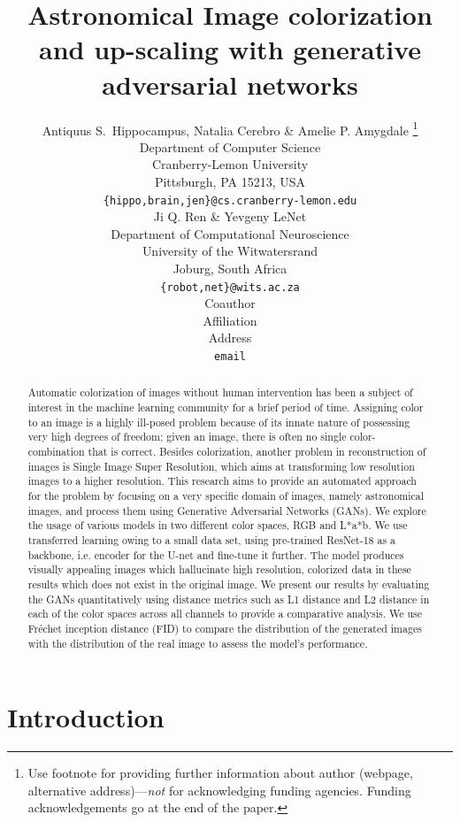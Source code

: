 \documentclass{article} %
\title{Astronomical Image colorization and up-scaling with generative adversarial networks}
\author{Antiquus S.~Hippocampus, Natalia Cerebro \& Amelie P. Amygdale \thanks{ Use footnote for providing further information
about author (webpage, alternative address)---\emph{not} for acknowledging
funding agencies.  Funding acknowledgements go at the end of the paper.} \\
Department of Computer Science\\
Cranberry-Lemon University\\
Pittsburgh, PA 15213, USA \\
\texttt{\{hippo,brain,jen\}@cs.cranberry-lemon.edu} \\
\And
Ji Q. Ren \& Yevgeny LeNet \\
Department of Computational Neuroscience \\
University of the Witwatersrand \\
Joburg, South Africa \\
\texttt{\{robot,net\}@wits.ac.za} \\
\AND
Coauthor \\
Affiliation \\
Address \\
\texttt{email}
}
\begin{document}
\usetikzlibrary{chains, calc,fit}

\maketitle

\begin{abstract}
Automatic colorization of images without human intervention has been a subject of interest in the machine learning community for a brief period of time. Assigning color to an image is a highly ill-posed problem because of its innate nature of possessing very high degrees of freedom; given an image, there is often no single color-combination that is correct. Besides colorization, another problem in reconstruction of images is Single Image Super Resolution, which aims at transforming low resolution images to a higher resolution. This research aims to provide an automated approach for the problem by focusing on a very specific domain of images, namely astronomical images, and process them using Generative Adversarial Networks (GANs). We explore the usage of various models in two different color spaces, RGB and L*a*b. We use transferred learning owing to a small data set, using pre-trained ResNet-18 as a backbone, i.e. encoder for the U-net and fine-tune it further. The model produces visually appealing images which hallucinate high resolution, colorized data in these results which does not exist in the original image. We present our results by evaluating the GANs quantitatively using distance metrics such as L1 distance and L2 distance in each of the color spaces across all channels to provide a comparative analysis. We use Fréchet inception distance (FID) to compare the distribution of the generated images with the distribution of the real image to assess the model's performance.
\end{abstract}

\section{Introduction}
\end{document}
